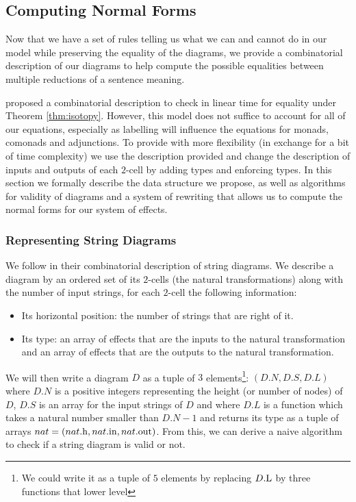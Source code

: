 \subsection{Computing Normal Forms}
Now that we have a set of rules telling us what we can and cannot do in our model while preserving the equality of the diagrams, we provide a combinatorial description of our diagrams to help compute the possible equalities between multiple reductions of a sentence meaning.

\cite{delpeuchNormalizationPlanarString2022} proposed a combinatorial description to check
in linear time for equality under Theorem \ref{thm:isotopy}.
However, this model does not suffice to account for all of our equations, especially as
labelling will influence the equations for monads, comonads and adjunctions.
To provide with more flexibility (in exchange for a bit of time complexity) we use the
description provided and change the description of inputs and outputs of each $2$-cell by
adding types and enforcing types.
In this section we formally describe the data structure we propose, as well as algorithms for
validity of diagrams and a system of rewriting that allows us to compute the normal forms
for our system of effects.

\subsubsection{Representing String Diagrams}
We follow \cite{delpeuchNormalizationPlanarString2022} in their combinatorial description
of string diagrams. We describe a diagram by an ordered set of its $2$-cells (the natural
transformations) along with the number of input strings, for each $2$-cell the following
information:
\begin{itemize}
	\item Its horizontal position: the number of strings that are right of it.
	\item Its type: an array of effects that are the inputs to the natural
	      transformation and an array of effects that are the outputs to the
	      natural transformation.
\end{itemize}
We will then write a diagram $D$ as a tuple of $3$ elements\footnote{We could write it
	as a tuple of $5$ elements by replacing $D\mathrm{.L}$ by three functions that lower level}:
$\left( D.N, D.S, D.L \right)$ where $D.N$ is a positive integers representing the
height (or number of nodes) of $D$, $D.S$ is an array for the input strings of $D$ and
where $D.L$ is a function which takes a natural number smaller than $D.N - 1$ and
returns its type as a tuple of arrays
$nat = \left( nat\mathrm{.h}, nat\mathrm{.in}, nat\mathrm{.out} \right)$.
From this, we can derive a naive algorithm to check if a string diagram is
valid or not.

